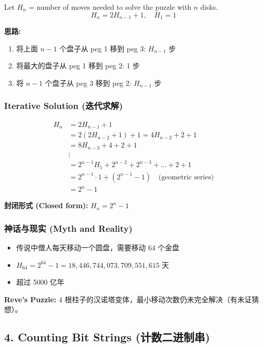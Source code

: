 \documentclass[10pt,a4paper,openany]{ctexbook}
\theoremstyle{definition}
\theoremstyle{remark}
\begin{document}
Let $H_n$ = number of moves needed to solve the puzzle with $n$ disks.
\[
H_n = 2H_{n-1} + 1, \quad H_1 = 1
\]

\textbf{思路:}
\begin{enumerate}
\item 将上面 $n-1$ 个盘子从 peg 1 移到 peg 3: $H_{n-1}$ 步
\item 将最大的盘子从 peg 1 移到 peg 2: 1 步
\item 将 $n-1$ 个盘子从 peg 3 移到 peg 2: $H_{n-1}$ 步

\end{enumerate}

\subsubsection{Iterative Solution (迭代求解)}

\[
\begin{aligned}
H_n &= 2H_{n-1} + 1 \\
    &= 2(2H_{n-2} + 1) + 1 = 4H_{n-2} + 2 + 1 \\
    &= 8H_{n-3} + 4 + 2 + 1 \\
    &\vdots \\
    &= 2^{n-1}H_1 + 2^{n-2} + 2^{n-3} + \dots + 2 + 1 \\
    &= 2^{n-1} \cdot 1 + (2^{n-1} - 1) \quad \text{(geometric series)} \\
    &= 2^n - 1
\end{aligned}
\]

\textbf{封闭形式 (Closed form):} $H_n = 2^n - 1$
\subsubsection{神话与现实 (Myth and Reality)}

\begin{itemize}
\item 传说中僧人每天移动一个圆盘，需要移动 64 个金盘
\item $H_{64} = 2^{64} - 1 = 18,446,744,073,709,551,615$ 天
\item 超过 5000 亿年

\end{itemize}

\textbf{Reve's Puzzle:} 4 根柱子的汉诺塔变体，最小移动次数仍未完全解决（有未证猜想）。
\vspace{-2pt}

\subsection{4. Counting Bit Strings (计数二进制串)}
\end{document}
